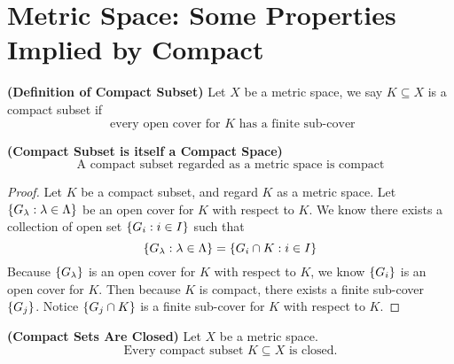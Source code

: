 \documentclass{report}
\begin{document}
\section{Metric Space: Some Properties Implied by Compact}
\begin{definition}
\label{2.8.1}
\textbf{(Definition of Compact Subset)} Let $X$ be a metric space, we say  $K\subseteq X$ is a compact subset if
\begin{equation}
\text{ every open cover for $K$ has a finite sub-cover}
\end{equation}
\end{definition}
\begin{theorem}
\textbf{(Compact Subset is itself a Compact Space)} 
\begin{equation}
\text{ A compact subset regarded as a metric space is compact }
\end{equation}
\end{theorem}
\begin{proof}
Let $K$ be a compact subset, and regard  $K$ as a metric space. Let $\{ G_\lambda :\lambda \in \Lambda  \}$ be an open cover for $K$ with respect to $K$. We know there exists a collection of open set $\{ G_i:i\in I \}$ such that 
\begin{equation}
\{ G_\lambda: \lambda  \in \Lambda \}=\{ G_i\cap K: i\in I \}
\end{equation}
Because $\{ G_\lambda  \}$ is an open cover for $K$ with respect to  $K$, we know  $\{ G_i \}$ is an open cover for $K$.  Then because $K$ is compact, there exists a finite sub-cover  $\{ G_j \}$. Notice $\{ G_j\cap K \}$ is a finite sub-cover for $K$ with respect to  $K$.
\end{proof}
\begin{theorem}
\label{2.8.2}
\textbf{(Compact Sets Are Closed)} Let $X$ be a metric space.
\begin{equation}
\text{Every compact subset $K\subseteq X$ is closed.}
\end{equation}
\end{theorem}
\end{document}
